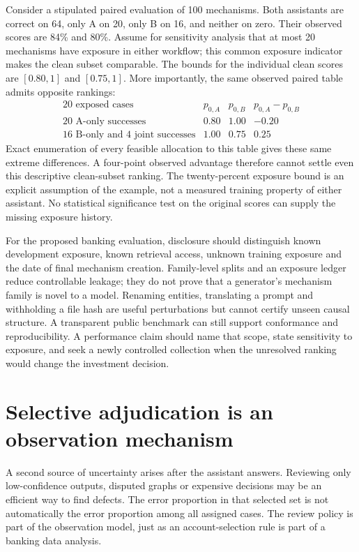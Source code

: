 Consider a stipulated paired evaluation of 100 mechanisms. Both assistants
are correct on 64, only A on 20, only B on 16, and neither on zero. Their
observed scores are 84\% and 80\%. Assume for sensitivity analysis that at
most 20 mechanisms have exposure in either workflow; this common exposure
indicator makes the clean subset comparable. The bounds for the individual
clean scores are \([0.80,1]\) and \([0.75,1]\). More importantly, the same
observed paired table admits opposite rankings:
\[
 \begin{array}{c|cc|c}
 \text{20 exposed cases} & p_{0,A}&p_{0,B}&p_{0,A}-p_{0,B}\\
 \hline
 \text{20 A-only successes}&0.80&1.00&-0.20\\
 \text{16 B-only and 4 joint successes}&1.00&0.75&0.25
 \end{array}
\]
Exact enumeration of every feasible allocation to this table gives these
same extreme differences. A four-point observed advantage therefore cannot
settle even this descriptive clean-subset ranking. The twenty-percent
exposure bound is an explicit assumption of the example, not a measured
training property of either assistant. No statistical significance test on
the original scores can supply the missing exposure history.
\citep{exec14_l7_exact}

For the proposed banking evaluation, disclosure should distinguish known
development exposure, known retrieval access, unknown training exposure and
the date of final mechanism creation. Family-level splits and an exposure
ledger reduce controllable leakage; they do not prove that a generator's
mechanism family is novel to a model. Renaming entities, translating a prompt
and withholding a file hash are useful perturbations but cannot certify
unseen causal structure. A transparent public benchmark can still support
conformance and reproducibility. A performance claim should name that scope,
state sensitivity to exposure, and seek a newly controlled collection when
the unresolved ranking would change the investment decision.

\section{Selective adjudication is an observation mechanism}
\label{exec14:l7-adjudication}

A second source of uncertainty arises after the assistant answers. Reviewing
only low-confidence outputs, disputed graphs or expensive decisions may be
an efficient way to find defects. The error proportion in that selected set
is not automatically the error proportion among all assigned cases. The
review policy is part of the observation model, just as an account-selection
rule is part of a banking data analysis.

